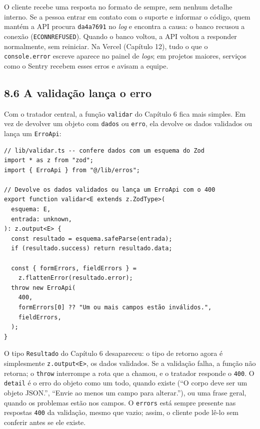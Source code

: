 O cliente recebe uma resposta no formato de sempre, sem nenhum detalhe interno. Se a pessoa entrar em contato com o suporte e informar o código, quem mantém a API procura \texttt{da4a7691} no \textit{log} e encontra a causa: o banco recusou a conexão (\texttt{ECONNREFUSED}). Quando o banco voltou, a API voltou a responder normalmente, sem reiniciar. Na Vercel (Capítulo 12), tudo o que o \texttt{console.error} escreve aparece no painel de \textit{logs}; em projetos maiores, serviços como o Sentry recebem esses erros e avisam a equipe.

\subsection{8.6 A validação lança o erro}

Com o tratador central, a função \texttt{validar} do Capítulo 6 fica mais simples. Em vez de devolver um objeto com \texttt{dados} ou \texttt{erro}, ela devolve os dados validados ou lança um \texttt{ErroApi}:

\begin{codigo}
\begin{Verbatim}[breaklines=true, breaksymbolleft={}, fontsize=\footnotesize]
// lib/validar.ts -- confere dados com um esquema do Zod
import * as z from "zod";
import { ErroApi } from "@/lib/erros";

// Devolve os dados validados ou lança um ErroApi com o 400
export function validar<E extends z.ZodType>(
  esquema: E,
  entrada: unknown,
): z.output<E> {
  const resultado = esquema.safeParse(entrada);
  if (resultado.success) return resultado.data;

  const { formErrors, fieldErrors } =
    z.flattenError(resultado.error);
  throw new ErroApi(
    400,
    formErrors[0] ?? "Um ou mais campos estão inválidos.",
    fieldErrors,
  );
}
\end{Verbatim}
\end{codigo}

O tipo \texttt{Resultado} do Capítulo 6 desapareceu: o tipo de retorno agora é simplesmente \texttt{z.output<E>}, os dados validados. Se a validação falha, a função não retorna; o \texttt{throw} interrompe a rota que a chamou, e o tratador responde o \texttt{400}. O \texttt{detail} é o erro do objeto como um todo, quando existe (``O corpo deve ser um objeto JSON.'', ``Envie ao menos um campo para alterar.''), ou uma frase geral, quando os problemas estão nos campos. O \texttt{errors} está sempre presente nas respostas \texttt{400} da validação, mesmo que vazio; assim, o cliente pode lê-lo sem conferir antes se ele existe.

